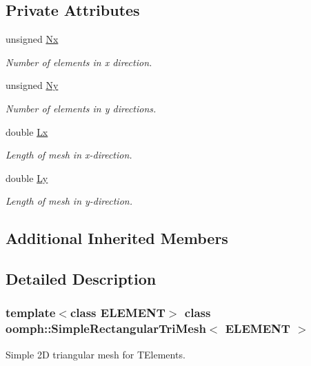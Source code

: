 \subsection*{Private Attributes}
\begin{DoxyCompactItemize}
\item 
unsigned \hyperlink{classoomph_1_1SimpleRectangularTriMesh_ad997a3ce1ed243b79cd49eb5a0687844}{Nx}
\begin{DoxyCompactList}\small\item\em Number of elements in x direction. \end{DoxyCompactList}\item 
unsigned \hyperlink{classoomph_1_1SimpleRectangularTriMesh_ac180c4ab5947c4417d912bc75621fc7e}{Ny}
\begin{DoxyCompactList}\small\item\em Number of elements in y directions. \end{DoxyCompactList}\item 
double \hyperlink{classoomph_1_1SimpleRectangularTriMesh_a85d3446550324f92540d389dfb4d063b}{Lx}
\begin{DoxyCompactList}\small\item\em Length of mesh in x-\/direction. \end{DoxyCompactList}\item 
double \hyperlink{classoomph_1_1SimpleRectangularTriMesh_adc35409d2a480d6de11d8df4ec23d1cf}{Ly}
\begin{DoxyCompactList}\small\item\em Length of mesh in y-\/direction. \end{DoxyCompactList}\end{DoxyCompactItemize}
\subsection*{Additional Inherited Members}


\subsection{Detailed Description}
\subsubsection*{template$<$class E\+L\+E\+M\+E\+NT$>$\newline
class oomph\+::\+Simple\+Rectangular\+Tri\+Mesh$<$ E\+L\+E\+M\+E\+N\+T $>$}

Simple 2D triangular mesh for T\+Elements. 

